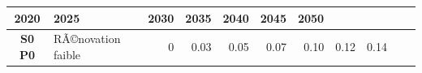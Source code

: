\documentclass[]{article}
\begin{document}
\begin{longtable}[]{@{}clrrrrrrrrr@{}}
\begin{minipage}[b]{0.05\columnwidth}
2020\strut
\end{minipage} & \begin{minipage}[b]{0.05\columnwidth}\raggedleft\strut
2025\strut
\end{minipage} & \begin{minipage}[b]{0.05\columnwidth}\raggedleft\strut
2030\strut
\end{minipage} & \begin{minipage}[b]{0.05\columnwidth}\raggedleft\strut
2035\strut
\end{minipage} & \begin{minipage}[b]{0.05\columnwidth}\raggedleft\strut
2040\strut
\end{minipage} & \begin{minipage}[b]{0.05\columnwidth}\raggedleft\strut
2045\strut
\end{minipage} & \begin{minipage}[b]{0.05\columnwidth}\raggedleft\strut
2050\strut
\end{minipage}\tabularnewline
\midrule
\endhead
\begin{minipage}[t]{0.12\columnwidth}\centering\strut
\textbf{S0 P0}\strut
\end{minipage} & \begin{minipage}[t]{0.17\columnwidth}\raggedright\strut
RÃ©novation faible\strut
\end{minipage} & \begin{minipage}[t]{0.05\columnwidth}\raggedleft\strut
0\strut
\end{minipage} & \begin{minipage}[t]{0.05\columnwidth}\raggedleft\strut
0.03\strut
\end{minipage} & \begin{minipage}[t]{0.05\columnwidth}\raggedleft\strut
0.05\strut
\end{minipage} & \begin{minipage}[t]{0.05\columnwidth}\raggedleft\strut
0.07\strut
\end{minipage} & \begin{minipage}[t]{0.05\columnwidth}\raggedleft\strut
0.10\strut
\end{minipage} & \begin{minipage}[t]{0.05\columnwidth}\raggedleft\strut
0.12\strut
\end{minipage} & \begin{minipage}[t]{0.05\columnwidth}\raggedleft\strut
0.14\strut
\end{minipage} & \begin{minipage}[t]{0.05\columnwidth}\raggedleft\strut

\end{minipage}
\end{longtable}
\end{document}
